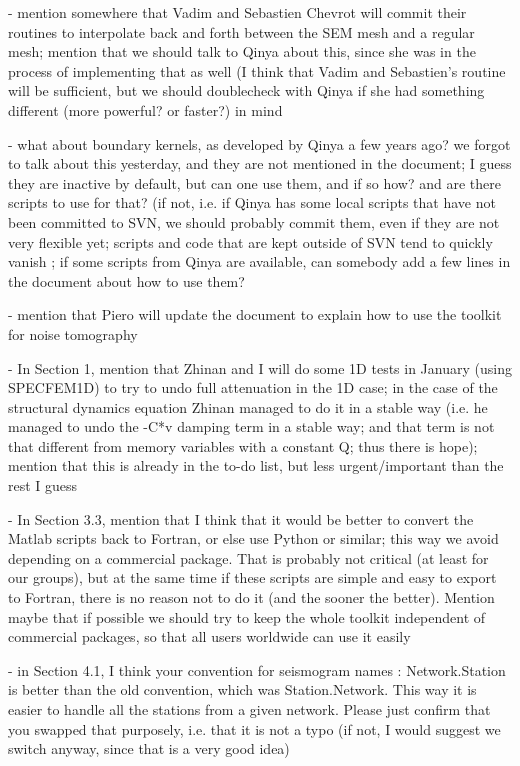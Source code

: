 \documentclass[11pt]{article}
\begin{document}
- mention somewhere that Vadim and Sebastien Chevrot will commit their routines to interpolate back and forth between the SEM mesh and a regular mesh; mention that we should talk to Qinya about this, since she was in the process of implementing that as well (I think that Vadim and Sebastien's routine will be sufficient, but we should doublecheck with Qinya if she had something different (more powerful? or faster?) in mind

- what about boundary kernels, as developed by Qinya a few years ago?
we forgot to talk about this yesterday, and they are not mentioned in the document; I guess they are inactive by default, but can one use them, and if so how? and are there scripts to use for that?
(if not, i.e. if Qinya has some local scripts that have not been committed to SVN, we should probably commit them, even if they are not very flexible yet; scripts and code that are kept outside of SVN tend to quickly vanish ; if some scripts from Qinya are available, can somebody add a few lines in the document about how to use them?

- mention that Piero will update the document to explain how to use the toolkit for noise tomography

- In Section 1, mention that Zhinan and I will do some 1D tests in January (using SPECFEM1D) to try to undo full attenuation in the 1D case; in the case of the structural dynamics equation Zhinan managed to do it in a stable way (i.e. he managed to undo the -C*v damping term in a stable way; and that term is not that different from memory variables with a constant Q; thus there is hope); mention that this is already in the to-do list, but less urgent/important than the rest I guess

- In Section 3.3, mention that I think that it would be better to convert the Matlab scripts back to Fortran, or else use Python or similar; this way we avoid depending on a commercial package. That is probably not critical (at least for our groups), but at the same time if these scripts are simple and easy to export to Fortran, there is no reason not to do it (and the sooner the better). Mention maybe that if possible we should try to keep the whole toolkit independent of commercial packages, so that all users worldwide can use it easily

- in Section 4.1, I think your convention for seismogram names : Network.Station is better than the old convention, which was Station.Network. This way it is easier to handle all the stations from a given network. Please just confirm that you swapped that purposely, i.e. that it is not a typo (if not, I would suggest we switch anyway, since that is a very good idea)
\end{document}
